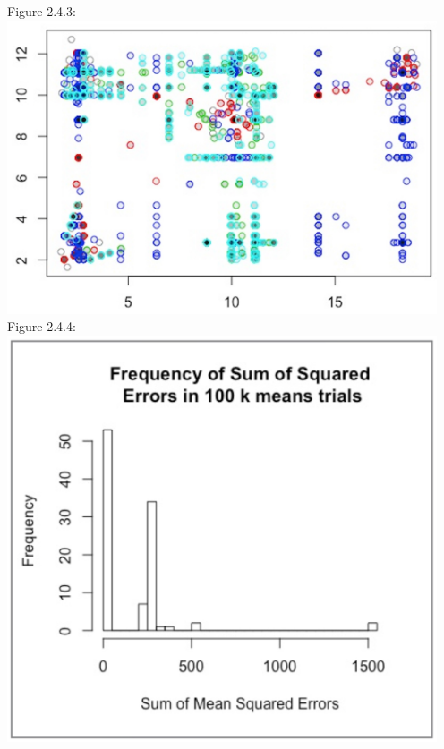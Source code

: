 \documentclass[12pt]{article}
\begin{document}
\begin{center}
  Figure 2.4.3:\\
  \includegraphics[width=5in]{plots/km_plot3.jpeg}\\

  Figure 2.4.4:\\
  \includegraphics[width=5in]{plots/km_plot4.jpeg}\\


\end{center}
\end{document}

